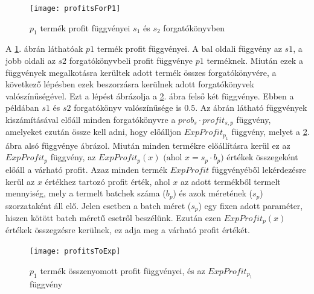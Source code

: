 \begin{figure}[H]
\begin{center}
\texttt{[image: profitsForP1]}
\caption{$p_1$ termék profit függvényei $s_1$ és $s_2$ forgatókönyvben}
\label{profit_for_p1}
\end{center}
\end{figure}
A \ref{profit_for_p1}. ábrán láthatóak $p1$ termék profit függvényei.
A bal oldali függvény az $s1$, a jobb oldali az $s2$ forgatókönyvbeli profit függvénye $p1$ terméknek.
Miután ezek a függvények megalkotásra kerültek adott termék összes forgatókönyvére, a következő lépésben ezek beszorzásra kerülnek adott forgatókönyvek valószínűségével.
Ezt a lépést ábrázolja a \ref{profitsToExp}. ábra felső két függvénye.
Ebben a példában $s1$ és $s2$ forgatókönyv valószínűsége is $0.5$.
Az ábrán látható függvények kiszámításával előáll minden forgatókönyvre a $prob_s \cdot profit_{s,p}$ függvény, amelyeket ezután össze kell adni, hogy előálljon $ExpProfit_{p_1}$ függvény, melyet a \ref{profitsToExp}. ábra alsó függvénye ábrázol.
Miután minden termékre előállításra kerül ez az $ExpProfit_p$ függvény, az $ExpProfit_p(x) \text{ (ahol }x=s_p \cdot b_p)$ értékek összegeként előáll a várható profit.
Azaz minden termék $ExpProfit$ függvényéből lekérdezésre kerül az $x$ értékhez tartozó profit érték, ahol $x$ az adott termékből termelt mennyiség, mely a termelt batchek száma ($b_p$) és azok méretének ($s_p$) szorzataként áll elő.
Jelen esetben a batch méret ($s_p$) egy fixen adott paraméter, hiszen kötött batch méretű esetről beszélünk.
Ezután ezen $ExpProfit_p(x)$ értékek összegzésre kerülnek, ez adja meg a várható profit értékét.
\begin{figure}
\begin{center}
\texttt{[image: profitsToExp]}
\caption{$p_1$ termék összenyomott profit függvényei, és az $ExpProfit_{p_1}$ függvény}
\label{profitsToExp}
\end{center}
\end{figure}
